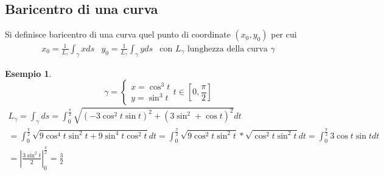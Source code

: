 \documentclass{book}
\newtheorem{esempio}{Esempio}
\begin{document}
\subsection{Baricentro di una curva}
Si definisce {\color{red} baricentro di una curva} quel punto di coordinate
$(x_0,y_0)$ per cui
\begin{equation*}
	\begin{matrix}
		x_0=\frac{1}{L_\gamma}\int_\gamma x ds & y_0=\frac{1}{L_\gamma}
		\int_\gamma yds & \text{con $L_\gamma$ lunghezza della curva $\gamma$}
	\end{matrix}
\end{equation*}
\begin{esempio}
	\begin{equation*}
		\gamma=\begin{cases}
			x=\cos^3t\\
			y=\sin^3 t
		\end{cases} t\in \left[0,\frac{\pi}{2}\right]
	\end{equation*}
	\begin{equation*}
		\begin{matrix}
				L_\gamma=\int_{\gamma}ds=\int_{0}^{\frac{\pi}{2}}\sqrt{(-3\cos^2t\sin
			t)^2+(3\sin^2+\cos t)^2} dt\\
			=\int_{0}^{\frac{\pi}{2}}\sqrt{9\cos^4t\sin^2t+9\sin^4t\cos^2t}dt= 
			\int_{0}^{\frac{\pi}{2}}\sqrt{9\cos^2t\sin^2t}*\sqrt{\cos^2t\sin^2t}
			dt = \int_{0}^{\frac{\pi}{2}}3\cos t\sin t dt\\=\left|
			\frac{3\sin^2t}{2}\right|_{0}^{\frac{\pi}{2}}=\frac{3}{2}
		\end{matrix}
	\end{equation*}
\end{esempio}
\printindex
\end{document}
